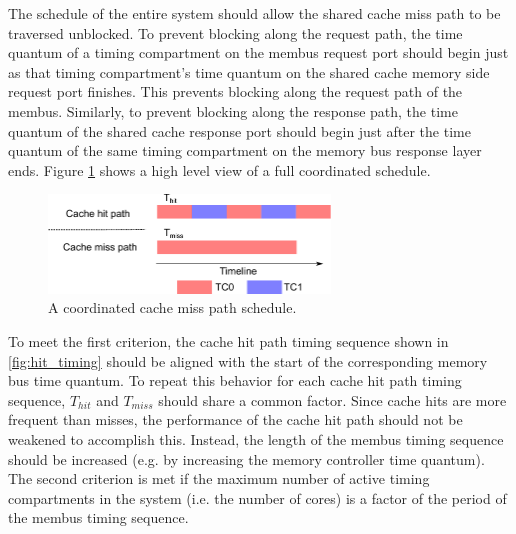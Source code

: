 The schedule of the entire system should allow the shared cache miss path to be 
traversed unblocked.
To prevent blocking along the request path, the time quantum of a timing 
compartment on the membus request port should begin just as that timing 
compartment's time quantum on the shared cache memory side request port 
finishes. This prevents blocking along the request path of the membus.
Similarly, to prevent blocking along the response path, the time quantum of the 
shared cache response port should begin just after the time quantum of the same 
timing compartment on the memory bus response layer ends. Figure 
\ref{fig:coordination}
shows a high level view of a full coordinated schedule.

\begin{figure}
    \begin{center}
        \includegraphics[width=2.9475in]{figs/coordination.pdf}
        \caption{A coordinated cache miss path schedule.}
        \label{fig:coordination}
    \end{center}
\end{figure}

To meet the first criterion, the cache hit path timing sequence shown in 
\ref{fig:hit_timing} should be aligned with the start of the corresponding 
memory bus time quantum. To repeat this behavior for each cache hit path timing 
sequence, $T_{hit}$ and $T_{miss}$
should share a common factor. Since cache 
hits are more frequent than misses, the performance of the cache hit path 
should not be weakened to accomplish this. Instead, the length of the membus 
timing sequence should be increased (e.g. by increasing the memory controller 
time quantum). The second criterion is met if the maximum number of active 
timing compartments in the system (i.e. the number of cores) is a factor of the 
period of the membus timing sequence.
